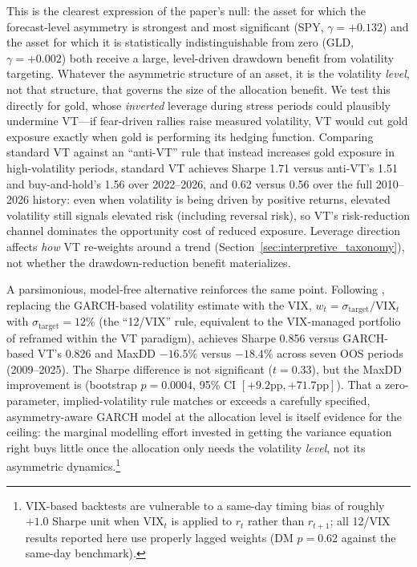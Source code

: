 This is the clearest expression of the paper's null: the asset for which the forecast-level asymmetry is strongest and most significant (SPY, $\gamma=+0.132$) and the asset for which it is statistically indistinguishable from zero (GLD, $\gamma=+0.002$) both receive a large, level-driven drawdown benefit from volatility targeting. Whatever the asymmetric structure of an asset, it is the volatility \emph{level}, not that structure, that governs the size of the allocation benefit. We test this directly for gold, whose \emph{inverted} leverage during stress periods could plausibly undermine VT---if fear-driven rallies raise measured volatility, VT would cut gold exposure exactly when gold is performing its hedging function. Comparing standard VT against an ``anti-VT'' rule that instead increases gold exposure in high-volatility periods, standard VT achieves Sharpe 1.71 versus anti-VT's 1.51 and buy-and-hold's 1.56 over 2022--2026, and 0.62 versus 0.56 over the full 2010--2026 history: even when volatility is being driven by positive returns, elevated volatility still signals elevated risk (including reversal risk), so VT's risk-reduction channel dominates the opportunity cost of reduced exposure. Leverage direction affects \emph{how} VT re-weights around a trend (Section~\ref{sec:interpretive_taxonomy}), not whether the drawdown-reduction benefit materializes.

A parsimonious, model-free alternative reinforces the same point. Following \citet{moreira2017}, replacing the GARCH-based volatility estimate with the VIX, $w_t = \sigma_{\text{target}}/\text{VIX}_t$ with $\sigma_{\text{target}}=12\%$ (the ``12/VIX'' rule, equivalent to the VIX-managed portfolio of \citealt{bozovic2024} reframed within the VT paradigm), achieves Sharpe 0.856 versus GARCH-based VT's 0.826 and MaxDD $-16.5\%$ versus $-18.4\%$ across seven OOS periods (2009--2025). The Sharpe difference is not significant ($t=0.33$), but the MaxDD improvement is (bootstrap $p=0.0004$, 95\% CI $[+9.2\text{pp},+71.7\text{pp}]$). That a zero-parameter, implied-volatility rule matches or exceeds a carefully specified, asymmetry-aware GARCH model at the allocation level is itself evidence for the ceiling: the marginal modelling effort invested in getting the variance equation right buys little once the allocation only needs the volatility \emph{level}, not its asymmetric dynamics.\footnote{VIX-based backtests are vulnerable to a same-day timing bias of roughly $+1.0$ Sharpe unit when $\text{VIX}_t$ is applied to $r_t$ rather than $r_{t+1}$; all 12/VIX results reported here use properly lagged weights (DM $p=0.62$ against the same-day benchmark).}

